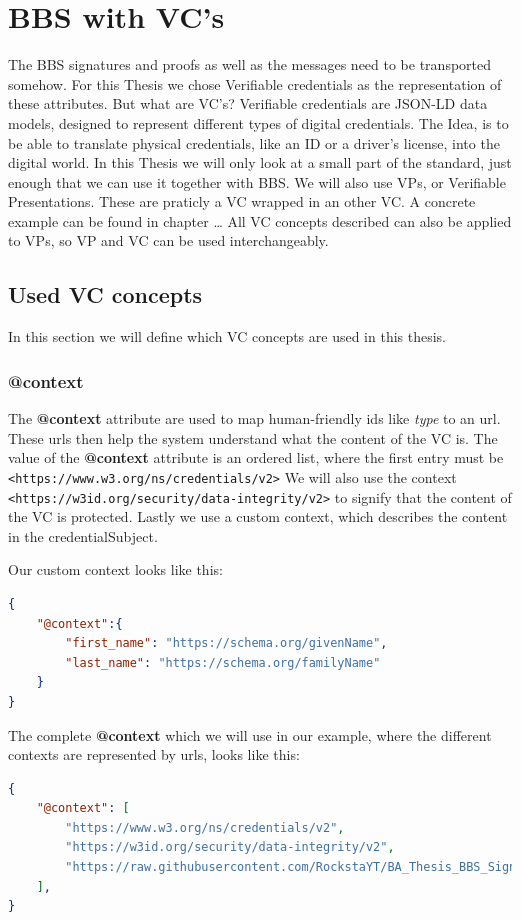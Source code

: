 \documentclass[
	a4paper               %
	,bibliography=totoc   %
	,listof=totoc         %
	,monolingual
	twoside=false,
]{bfhthesis}              %
\begin{document}
\section{BBS with VC's}
The BBS signatures and proofs as well as the messages need to be transported somehow.
For this Thesis we chose Verifiable credentials \cite{verifiable-credentials} as the representation of these attributes.
But what are VC's? \newline
Verifiable credentials are JSON-LD data models, designed to represent different types of digital credentials.
The Idea, is to be able to translate physical credentials, like an ID or a driver's license, into the digital world.
In this Thesis we will only look at a small part of the standard, just enough that we can use it together with BBS.
We will also use VPs, or Verifiable Presentations. These are praticly a VC wrapped in an other VC.
A concrete example can be found in chapter \dots
All VC concepts described can also be applied to VPs, so VP and VC can be used interchangeably.

\subsection{Used VC concepts}
In this section we will define which VC concepts are used in this thesis.

\subsubsection{@context}
The \textbf{@context} attribute are used to map human-friendly ids like \textit{type} to an url.
These urls then help the system understand what the content of the VC is.
The value of the \textbf{@context} attribute is an ordered list, where the first entry must be \verb|<https://www.w3.org/ns/credentials/v2>|
We will also use the context \verb|<https://w3id.org/security/data-integrity/v2>| to signify that the content of the VC is protected.
Lastly we use a custom context, which describes the content in the credentialSubject.

Our custom context looks like this:
\begin{lstlisting}[language=json,firstnumber=1,caption={Example custom context},captionpos=b]
{
    "@context":{
        "first_name": "https://schema.org/givenName",
        "last_name": "https://schema.org/familyName"
    }
}
\end{lstlisting}

The complete \textbf{@context} which we will use in our example, where the different contexts are represented by urls, looks like this:
\begin{lstlisting}[language=json,firstnumber=1,caption={Example context},captionpos=b]
{
	"@context": [
		"https://www.w3.org/ns/credentials/v2",
		"https://w3id.org/security/data-integrity/v2",
		"https://raw.githubusercontent.com/RockstaYT/BA_Thesis_BBS_Signatures/docs/context/example_1.jsonld"
	],
}
\end{lstlisting}
\end{document}
